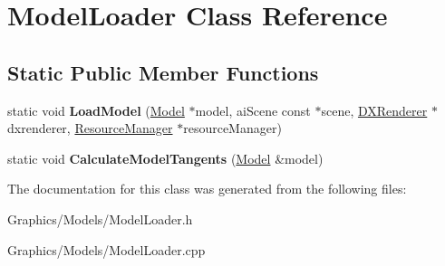 \hypertarget{classModelLoader}{}\section{Model\+Loader Class Reference}
\label{classModelLoader}
\subsection*{Static Public Member Functions}
\begin{DoxyCompactItemize}
\item 
\mbox{\label{classModelLoader_af286ff6c28ac0e7de71dcc4572779ed0}} 
static void {\bfseries Load\+Model} (\hyperlink{classModel}{Model} $\ast$model, ai\+Scene const $\ast$scene, \hyperlink{classDXRenderer}{D\+X\+Renderer} $\ast$dxrenderer, \hyperlink{classResourceManager}{Resource\+Manager} $\ast$resource\+Manager)
\item 
\mbox{\label{classModelLoader_aa7d14780f5e86d6ffae9ee2771a822f3}} 
static void {\bfseries Calculate\+Model\+Tangents} (\hyperlink{classModel}{Model} \&model)
\end{DoxyCompactItemize}


The documentation for this class was generated from the following files\+:\begin{DoxyCompactItemize}
\item 
Graphics/\+Models/Model\+Loader.\+h\item 
Graphics/\+Models/Model\+Loader.\+cpp\end{DoxyCompactItemize}

